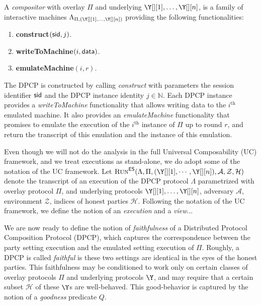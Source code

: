 \begin{definition}[Compositor]
  A \emph{compositor} with overlay $\Pi$ and underlying $\Y[][1], \ldots, \Y[][n]$,
  is a family of interactive machines
  $\Lambda_{\Pi,(\Y[][1], \ldots, \Y[][n])}$ providing the following
  functionalities:

  \begin{enumerate}
    \item \textbf{construct}$(\textsf{sid}, j)$.
    \item \textbf{writeToMachine}$(i, \textsf{data})$.
    \item \textbf{emulateMachine}$(i, r)$. %
  \end{enumerate}
\end{definition}

The DPCP is constructed by calling \emph{construct} with parameters the session identifier $\textsf{sid}$
and the DPCP instance identity $j \in \mathbb{N}$. Each DPCP instance provides a \emph{writeToMachine}
functionality that allows writing data to the $i^\text{th}$ emulated machine.
It also provides an \emph{emulateMachine} functionality that promises to emulate the execution of
the $i^\text{th}$ instance of $\Pi$ up to round $r$, and return the transcript of this emulation
and the instance of this emulation.

Even though we will not do the analysis in the full Universal Composability (UC) framework, and
we treat executions as stand-alone, we do adopt some of the notation of the UC framework.
Let $\LCExec(\Lambda, \Pi, ({\Y[][1]}, \cdots, {\Y[][n]}), \mathcal{A}, \mathcal{Z}, \mathcal{H})$
denote the transcript of an execution of the DPCP protocol $\Lambda$ parametrized with overlay protocol $\Pi$,
and underlying protocols $\Y[][1], \ldots, \Y[][n]$, adversary $\mathcal{A}$, environment $\mathcal{Z}$,
indices of honest parties $\mathcal{H}$.
Following the notation of the UC framework, we define the notion of an \emph{execution}
and a \emph{view}... %

We are now ready to define the notion of \emph{faithfulness} of a
Distributed Protocol Composition Protocol (DPCP), which captures the
correspondence between the party setting execution and the emulated setting
execution of $\Pi$. Roughly, a DPCP is called \emph{faithful} is these
two settings are identical in the eyes of the honest parties.
This faithfulness may be conditioned to work only on certain classes
of overlay protocols $\Pi$ and underlying protocols $\Y$, and may
require that a certain subset $\mathcal{H}$ of these $\Y$s are well-behaved.
This good-behavior is captured by the notion of a \emph{goodness} predicate $Q$.

